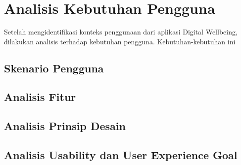 \newcommand{\cccnormspacing}{\baselineskip=12pt}
\newcommand{\cccnormspacingcenter}{\centering\arraybackslash\cccnormspacing}


\section{Analisis Kebutuhan Pengguna}

Setelah mengidentifikasi konteks penggunaan dari aplikasi Digital Wellbeing, dilakukan analisis terhadap kebutuhan pengguna. Kebutuhan-kebutuhan ini 

\subsection{Skenario Pengguna}
\subsection{Analisis Fitur}
\subsection{Analisis Prinsip Desain}
\subsection{Analisis Usability dan User Experience Goal}






